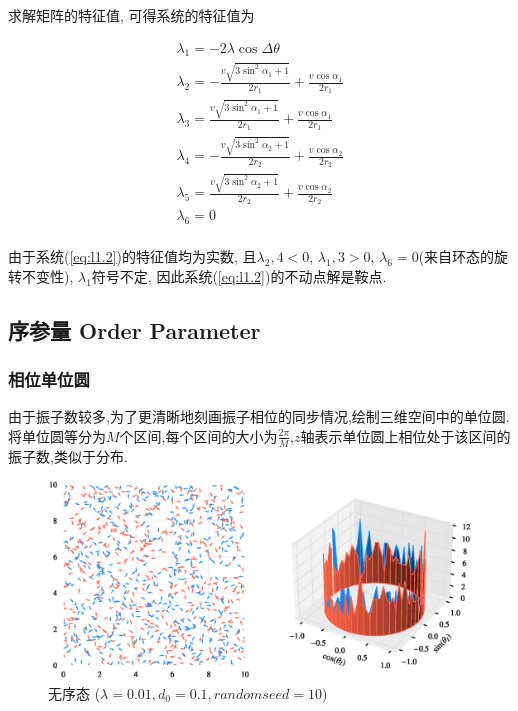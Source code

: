 \documentclass{article}
\begin{document}
求解矩阵的特征值, 可得系统的特征值为

$$
\begin{array}{l}
	\lambda _1=-2\lambda \cos \Delta \theta\\
	\lambda _2=-\frac{v\sqrt{3\sin ^2\alpha _1+1}}{2r_1}+\frac{v\cos \alpha _1}{2r_1}\\
	\lambda _3=\frac{v\sqrt{3\sin ^2\alpha _1+1}}{2r_1}+\frac{v\cos \alpha _1}{2r_1}\\
	\lambda _4=-\frac{v\sqrt{3\sin ^2\alpha _2+1}}{2r_2}+\frac{v\cos \alpha _2}{2r_2}\\
	\lambda _5=\frac{v\sqrt{3\sin ^2\alpha _2+1}}{2r_2}+\frac{v\cos \alpha _2}{2r_2}\\
	\lambda _6=0\\
\end{array}
$$

由于系统(\ref{eq:l1.2})的特征值均为实数, 且$\lambda _2,4<0$, $\lambda _1,3>0$, $\lambda _6=0$(来自环态的旋转不变性), $\lambda _1$符号不定, 因此系统(\ref{eq:l1.2})的不动点解是鞍点. 


\newpage
\subsection{序参量 Order Parameter}

\subsubsection{相位单位圆}

由于振子数较多,为了更清晰地刻画振子相位的同步情况,绘制三维空间中的单位圆. 将单位圆等分为$M$个区间,每个区间的大小为$\frac{2\pi}{M}$,$z$轴表示单位圆上相位处于该区间的振子数,类似于分布.

\begin{figure}[H]
	\centering
	\includegraphics[width=\textwidth]{./figs/CorrectCoupling_uniform_0.010_0.10.eps}
	\vspace{-1cm}
	\caption{无序态 ($\lambda=0.01, d_0=0.1, random seed=10$)}
	\label{fig:fig231.1}
\end{figure}
\end{document}
